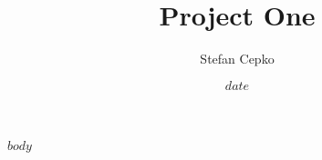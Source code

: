 \documentclass[12pt]{article}
\title{Project One}
\author{Stefan Cepko}
\date{$date$}
\begin{document}
\maketitle
$body$
\end{document}
